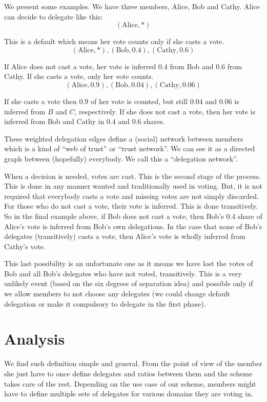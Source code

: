 \documentclass[a4paper]{acm_proc_article-sp}
\begin{document}
We present some examples. We have three members, Alice, Bob and Cathy. Alice can decide to delegate like this:
$$(\mathrm{Alice}, *)$$

This is a default which means her vote counts only if she casts a vote.
$$(\mathrm{Alice}, *), (\mathrm{Bob}, 0.4), (\mathrm{Cathy}, 0.6)$$

If Alice does not cast a vote, her vote is inferred $0.4$ from Bob and $0.6$ from Cathy. If she casts a vote, only her
vote counts.
$$(\mathrm{Alice}, 0.9), (\mathrm{Bob}, 0.04), (\mathrm{Cathy}, 0.06)$$

If she casts a vote then $0.9$ of her vote is counted, but still $0.04$ and $0.06$ is inferred from $B$ and $C$, respectively.
If she does not cast a vote, then her vote is inferred from Bob and Cathy in $0.4$ and $0.6$ shares.

These weighted delegation edges define a (social) network between members which is a kind of ``web of trust'' or
``trust network''. We can see it as a directed graph between (hopefully) everybody. We call this a ``delegation network''.

When a decision is needed, votes are cast. This is the second stage of the process. This is done in any manner wanted and
traditionally used in voting. But, it is not required that everybody casts a vote and missing votes are not
simply discarded. For those who do not cast a vote, their vote is inferred. This is done transitively. So in the final example
above, if Bob does not cast a vote, then Bob's $0.4$ share of Alice's vote is inferred from Bob's own delegations. In the
case that none of Bob's delegates (transitively) casts a vote, then Alice's vote is wholly inferred from Cathy's vote.

This last possibility is an unfortunate one as it means we have lost the votes of Bob and all Bob's delegates who have not
voted, transitively. This is a very unlikely event (based on the six degrees of separation idea) and possible only if we allow
members to not choose any delegates (we could change default delegation or make it compulsory to delegate in the first phase).

\section{Analysis}

We find such definition simple and general. From the point of view of the member she just have to once define delegates and ratios
between them and the scheme takes care of the rest. Depending on the use case of our scheme, members might have to define
multiple sets of delegates for various domains they are voting in.
\end{document}
